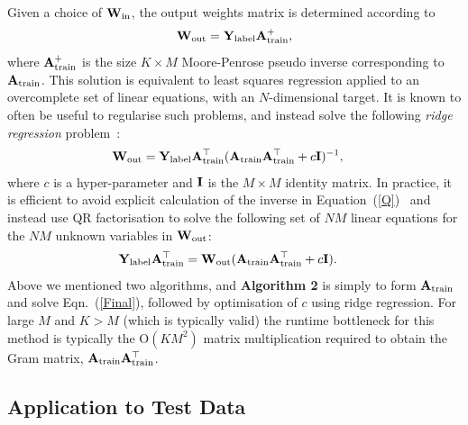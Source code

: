 \documentclass[conference]{IEEEtran}
\begin{document}
Given a choice of ${\bf W}_{\rm in}$, the output weights matrix is determined according to
\begin{align}\label{T2}
{\bf W}_{\rm out} = {\bf Y}_{\rm label}{\bf A}_{\rm train}^+,
\end{align}
where ${\bf A}_{\rm train}^+$ is the size $K\times M$ Moore-Penrose pseudo inverse corresponding to ${\bf A}_{\rm train}$. This solution is equivalent to least squares regression applied to an overcomplete set of linear equations, with an $N$-dimensional target.  It is known to often be useful to regularise such problems, and instead solve the following {\em ridge regression} problem~\cite{Huang.12,Huang.14}:
\begin{align}\label{Q}
{\bf W}_{\rm out} &= {\bf Y}_{\rm label}{\bf A}_{\rm train}^{\top}({\bf A}_{\rm train}{\bf A}_{\rm train}^{\top}+c{\bf I})^{-1},
\end{align}
where $c$ is a hyper-parameter and ${\bf I}$ is the $M\times M$ identity matrix. In practice, it is efficient to avoid explicit calculation of the inverse in Equation~(\ref{Q})~\cite{McDonnell.15PLOS} and instead use QR factorisation to solve the following set of $NM$ linear equations for the $NM$ unknown variables in ${\bf W}_{\rm out}$:
\begin{align}\label{Final}
{\bf Y}_{\rm label}{\bf A}_{\rm train}^{\top} &= {\bf W}_{\rm out}({\bf A}_{\rm train}{\bf A}_{\rm train}^{\top}+c{\bf I}).
\end{align}
Above we mentioned two algorithms, and {\bf Algorithm 2} is simply to form ${\bf A}_{\rm train}$ and solve Eqn.~(\ref{Final}), followed by optimisation of $c$ using ridge regression. For large $M$ and $K>M$ (which is typically valid) the runtime bottleneck for this method is typically the O$(KM^2)$ matrix multiplication required to obtain the Gram matrix, ${\bf A}_{\rm train}{\bf A}_{\rm train}^{\top}$.

\subsection{Application to Test Data}
\end{document}
